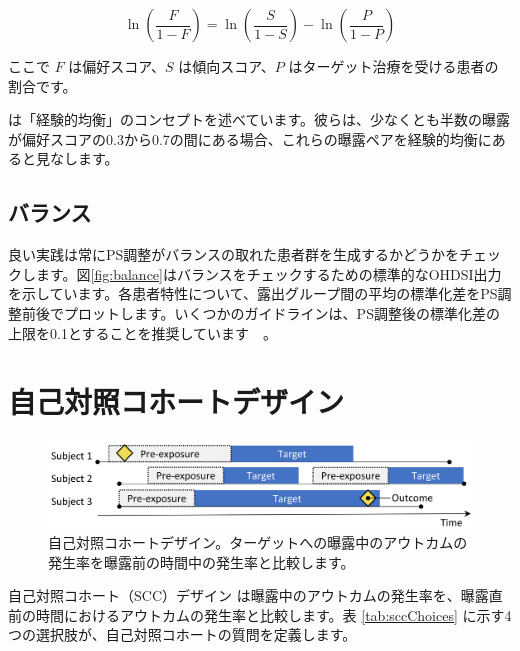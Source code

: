 \documentclass[
  11pt]{book}
\theoremstyle{definition}
\theoremstyle{definition}
\theoremstyle{definition}
\theoremstyle{definition}
\theoremstyle{remark}
\begin{document}
\[\ln\left(\frac{F}{1-F}\right)=\ln\left(\frac{S}{1-S}\right)-\ln\left(\frac{P}{1-P}\right)\]

ここで \(F\) は偏好スコア、\(S\) は傾向スコア、\(P\) はターゲット治療を受ける患者の割合です。

\citet{walker_2013} は「経験的均衡」のコンセプトを述べています。彼らは、少なくとも半数の曝露が偏好スコアの0.3から0.7の間にある場合、これらの曝露ペアを経験的均衡にあると見なします。 

\subsection{バランス}\label{ux30d0ux30e9ux30f3ux30b9}

 

良い実践は常にPS調整がバランスの取れた患者群を生成するかどうかをチェックします。図\ref{fig:balance}はバランスをチェックするための標準的なOHDSI出力を示しています。各患者特性について、露出グループ間の平均の標準化差をPS調整前後でプロットします。いくつかのガイドラインは、PS調整後の標準化差の上限を0.1とすることを推奨しています　\citep{rubin_2001}。

\section{自己対照コホートデザイン}\label{ux81eaux5df1ux5bfeux7167ux30b3ux30dbux30fcux30c8ux30c7ux30b6ux30a4ux30f3}


\begin{figure}[h]

{\centering \includegraphics[width=0.9\linewidth]{images/PopulationLevelEstimation/selfControlledCohort} 

}

\caption{自己対照コホートデザイン。ターゲットへの曝露中のアウトカムの発生率を曝露前の時間中の発生率と比較します。}\label{fig:scc}
\end{figure}

自己対照コホート（SCC）デザイン \citep{ryan_2013} は曝露中のアウトカムの発生率を、曝露直前の時間におけるアウトカムの発生率と比較します。表 \ref{tab:sccChoices} に示す4つの選択肢が、自己対照コホートの質問を定義します。 
\end{document}

